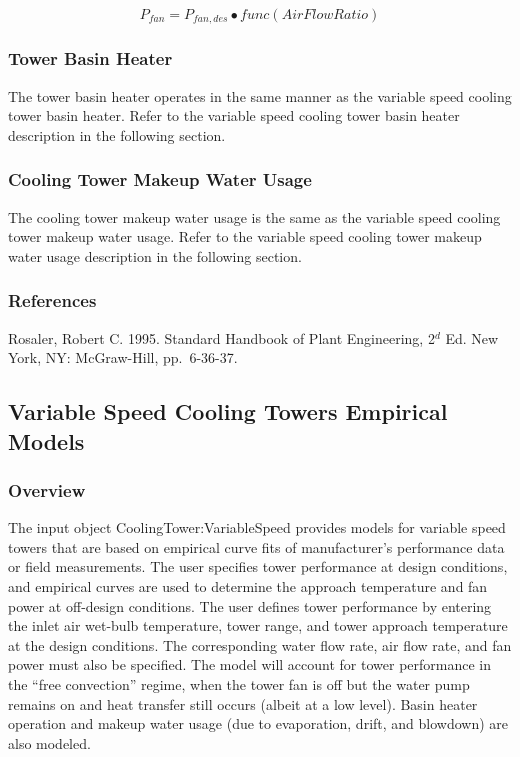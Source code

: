 \begin{equation}
{P_{fan}} = {P_{fan,des}} \bullet func\left( {AirFlowRatio} \right)
\end{equation}

\subsubsection{Tower Basin Heater}\label{tower-basin-heater}

The tower basin heater operates in the same manner as the variable speed cooling tower basin heater. Refer to the variable speed cooling tower basin heater description in the following section.

\subsubsection{Cooling Tower Makeup Water Usage}\label{cooling-tower-makeup-water-usage}

The cooling tower makeup water usage is the same as the variable speed cooling tower makeup water usage. Refer to the variable speed cooling tower makeup water usage description in the following section.

\subsubsection{References}\label{references-015}

Rosaler, Robert C. 1995. Standard Handbook of Plant Engineering, 2\(^{d}\) Ed. New York, NY: McGraw-Hill, pp.~6-36-37.

\subsection{Variable Speed Cooling Towers Empirical Models}\label{variable-speed-cooling-towers-empirical-models}

\subsubsection{Overview}\label{overview-1-005}

The input object CoolingTower:VariableSpeed provides models for variable speed towers that are based on empirical curve fits of manufacturer's performance data or field measurements. The user specifies tower performance at design conditions, and empirical curves are used to determine the approach temperature and fan power at off-design conditions. The user defines tower performance by entering the inlet air wet-bulb temperature, tower range, and tower approach temperature at the design conditions. The corresponding water flow rate, air flow rate, and fan power must also be specified. The model will account for tower performance in the ``free convection'' regime, when the tower fan is off but the water pump remains on and heat transfer still occurs (albeit at a low level). Basin heater operation and makeup water usage (due to evaporation, drift, and blowdown) are also modeled.


